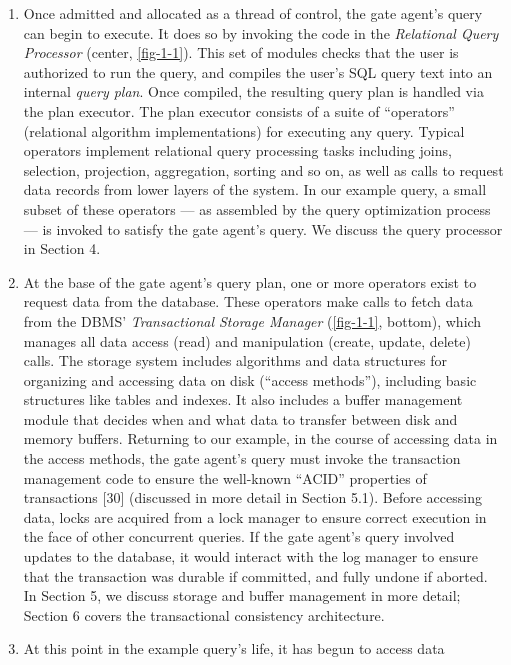 \documentclass[b5paper,11pt,twoside,openright]{book}
\begin{document}
\begin{enumerate}
  \item
    Once admitted and allocated as a thread of control, the gate agent's
    query can begin to execute. It does so by invoking the code in the
    \emph{Relational Query Processor} (center, \autoref{fig-1-1}). This set of
    modules checks that the user is authorized to run the query, and
    compiles the user's SQL query text into an internal \emph{query
    plan}. Once compiled, the resulting query plan is handled via the
    plan executor. The plan executor consists of a suite of
    ``operators'' (relational algorithm implementations) for executing
    any query. Typical operators implement relational query processing
    tasks including joins, selection, projection, aggregation, sorting
    and so on, as well as calls to request data records from lower
    layers of the system. In our example query, a small subset of these
    operators --- as assembled by the query optimization process --- is
    invoked to satisfy the gate agent's query. We discuss the query
    processor in Section 4.
  \item
    At the base of the gate agent's query plan, one or more operators
    exist to request data from the database. These operators make calls
    to fetch data from the DBMS' \emph{Transactional Storage Manager}
    (\autoref{fig-1-1}, bottom), which manages all data access (read) and
    manipulation (create, update, delete) calls. The storage system
    includes algorithms and data structures for organizing and accessing
    data on disk (``access methods''), including basic structures like
    tables and indexes. It also includes a buffer management module that
    decides when and what data to transfer between disk and memory
    buffers. Returning to our example, in the course of accessing data
    in the access methods, the gate agent's query must invoke the
    transaction management code to ensure the well-known ``ACID''
    properties of transactions {[}30{]} (discussed in more detail in
    Section 5.1). Before accessing data, locks are acquired from a lock
    manager to ensure correct execution in the face of other concurrent
    queries. If the gate agent's query involved updates to the database,
    it would interact with the log manager to ensure that the
    transaction was durable if committed, and fully undone if aborted.
    In Section 5, we discuss storage and buffer management in more
    detail; Section 6 covers the transactional consistency architecture.
\item
  At this point in the example query's life, it has begun to access data

\end{enumerate}
\end{document}

